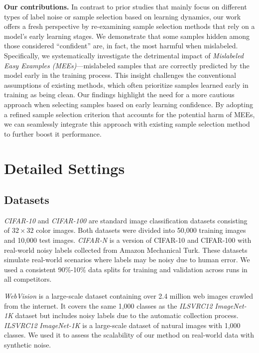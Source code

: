 \textbf{Our contributions.}
In contrast to prior studies that mainly focus on different types of label noise or sample selection based on learning dynamics, our work offers a fresh perspective by re-examining sample selection methods that rely on a model's early learning stages. We demonstrate that some samples hidden among those considered ``confident'' are, in fact, the most harmful when mislabeled. Specifically, we systematically investigate the detrimental impact of \textit{Mislabeled Easy Examples (MEEs)}—mislabeled samples that are correctly predicted by the model early in the training process.
This insight challenges the conventional assumptions of existing methods, which often prioritize samples learned early in training as being clean. Our findings highlight the need for a more cautious approach when selecting samples based on early learning confidence. By adopting a refined sample selection criterion that accounts for the potential harm of MEEs, we can seamlessly integrate this approach with existing sample selection method \cite{yuan2023late} to further boost it performance.

\clearpage

\section{Detailed Settings}
\label{appendix:C}

\subsection{Datasets}

\emph{CIFAR-10} and \emph{CIFAR-100} \cite{krizhevsky2009learning} are standard image classification datasets consisting of $32 \times 32$ color images. Both datasets were divided into 50,000 training images and 10,000 test images.
\emph{CIFAR-N} \cite{wei2021learning} is a version of CIFAR-10 and CIFAR-100 with real-world noisy labels collected from Amazon Mechanical Turk. These datasets simulate real-world scenarios where labels may be noisy due to human error.
We used a consistent 90\%-10\% data splits for training and validation across runs in all competitors.


\emph{WebVision} \cite{li2017webvision} is a large-scale dataset containing over 2.4 million web images crawled from the internet. It covers the same 1,000 classes as the \emph{ILSVRC12} \emph{ImageNet-1K} dataset \cite{deng2009imagenet} but includes noisy labels due to the automatic collection process.
\emph{ILSVRC12} \emph{ImageNet-1K} \cite{deng2009imagenet} is a large-scale dataset of natural images with 1,000 classes. We used it to assess the scalability of our method on real-world data with synthetic noise.

